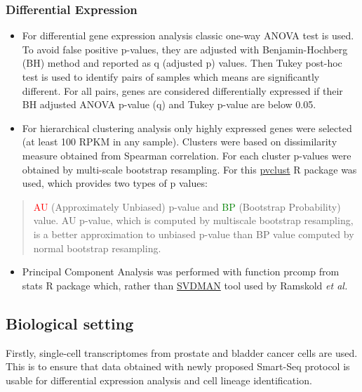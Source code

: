 \documentclass[]{article}
\providecommand{\tightlist}{%
  \setlength{\itemsep}{0pt}\setlength{\parskip}{0pt}}
\begin{document}
\subsubsection{Differential Expression}\label{differential-expression}

\begin{itemize}
\item
  For differential gene expression analysis classic one-way ANOVA test
  is used. To avoid false positive p-values, they are adjusted with
  Benjamin-Hochberg (BH) method and reported as q (adjusted p) values.
  Then Tukey post-hoc test is used to identify pairs of samples which
  means are significantly different. For all pairs, genes are considered
  differentially expressed if their BH adjusted ANOVA p-value (q) and
  Tukey p-value are below 0.05.
\item
  For hierarchical clustering analysis only highly expressed genes were
  selected (at least 100 RPKM in any sample). Clusters were based on
  dissimilarity measure obtained from Spearman correlation. For each
  cluster p-values were obtained by multi-scale bootstrap resampling.
  For this \href{http://stat.sys.i.kyoto-u.ac.jp/prog/pvclust/}{pvclust}
  R package was used, which provides two types of p values:
\end{itemize}

\begin{quote}
\textcolor{red}{AU} (Approximately Unbiased) p-value and
\textcolor{green}{BP} (Bootstrap Probability) value. AU p-value, which
is computed by multiscale bootstrap resampling, is a better
approximation to unbiased p-value than BP value computed by normal
bootstrap resampling.
\end{quote}

\begin{itemize}
\tightlist
\item
  Principal Component Analysis was performed with function prcomp from
  stats R package which, rather than
  \href{https://www.ncbi.nlm.nih.gov/pubmed/11395437}{SVDMAN} tool used
  by Ramskold \emph{et al.}
\end{itemize}

\subsection{Biological setting}\label{biological-setting}

Firstly, single-cell transcriptomes from prostate and bladder cancer
cells are used. This is to ensure that data obtained with newly proposed
Smart-Seq protocol is usable for differential expression analysis and
cell lineage identification.
\end{document}
